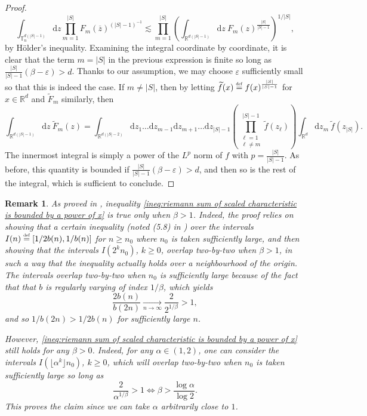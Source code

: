 \documentclass[10pt,a4paper]{amsart}
\newcommand{\RR}{\mathbb R}
\newcommand{\TT}{\mathbb T}
\newcommand{\1}{\mathds{1}}
\renewcommand{\d}{\mathrm d}
\newcommand{\eqdef}{\stackrel{\scaleto{\mathrm{def}}{3.5pt}}{=}}
\newtheorem*{remark}{Remark}
\numberwithin{equation}{section}
\begin{document}
\begin{proof}
    \begin{equation*}
        \int_{\TT_n^{d(|S|-1)}}\d z\prod_{m=1}^{|S|}F_m(\overline z)^{(|S|-1)^{-1}}\lesssim \prod_{m=1}^{|S|}\left(\int_{\RR^{d(|S|-1)}}\d z \ F_m(z)^{\frac{|S|}{|S|-1}}\right)^{1/|S|},
    \end{equation*}
    by Hölder's inequality.
    Examining the integral coordinate by coordinate, it is clear that the term $m=|S|$ in the previous expression is finite so long as $\frac{|S|}{|S|-1}(\beta-\varepsilon)>d$. Thanks to our assumption, we may choose $\varepsilon$ sufficiently small so that this is indeed the case. If $m\ne|S|$, then by letting $\widetilde f(x)\eqdef f(x)^{\frac{|S|}{|S|-1}}$ for $x\in\RR^d$ and $\widetilde F_m$ similarly, then
    \begin{equation*}
        \int_{\RR^{d(|S|-1)}}\d z\ \widetilde F_m(z)=\int_{\RR^{d(|S|-2)}}\d z_1\dots\d z_{m-1}\d z_{m+1}\dots\d z_{|S|-1}\left(\prod_{\substack{\ell=1 \\ \ell\ne m}}^{|S|-1}\widetilde f(z_\ell)\right)\int_{\RR^d}\d z_m\ \widetilde f(z_{|S|}).
    \end{equation*}
    The innermost integral is simply a power of the $L^p$ norm of $f$ with $p=\frac{|S|}{|S|-1}$. As before, this quantity is bounded if $\frac{|S|}{|S|-1}(\beta-\varepsilon)>d$, and then so is the rest of the integral, which is sufficient to conclude.
\end{proof}

\begin{remark}
    As proved in \cite{RosenRandomWalks&IntersectionLocalTimes1990}, inequality \eqref{ineq:riemann sum of scaled characteristic is bounded by a power of x} is true only when $\beta>1$. Indeed, the proof relies on showing that a certain inequality (noted (5.8) in \cite{RosenRandomWalks&IntersectionLocalTimes1990}) over the intervals $I(n)\eqdef[1/2b(n),1/b(n)]$ for $n\ge n_0$ where $n_0$ is taken sufficiently large, and then showing that the intervals $I(2^kn_0)$, $k\ge0$, overlap two-by-two when $\beta>1$, in such a way that the inequality actually holds over a neighbourhood of the origin. The intervals overlap two-by-two when $n_0$ is sufficiently large because of the fact that that $b$ is regularly varying of index $1/\beta$, which yields
    \begin{equation*}
        \frac{2b(n)}{b(2n)}\underset{n\rightarrow\infty}\longrightarrow \frac{2}{2^{1/\beta}}>1,
    \end{equation*}
    and so $1/b(2n)>1/2b(n)$ for sufficiently large $n$.

    However, \eqref{ineq:riemann sum of scaled characteristic is bounded by a power of x} still holds for any $\beta>0$. Indeed, for any $\alpha\in(1,2)$, one can consider the intervals $I(\lfloor\alpha^k\rfloor n_0)$, $k\ge0$, which will overlap two-by-two when $n_0$ is taken sufficiently large so long as 
    \begin{equation*}
        \frac{2}{\alpha^{1/\beta}}>1\iff \beta>\frac{\log\alpha}{\log 2}.
    \end{equation*}
    This proves the claim since we can take $\alpha$ arbitrarily close to $1$.
\end{remark}
\end{document}
